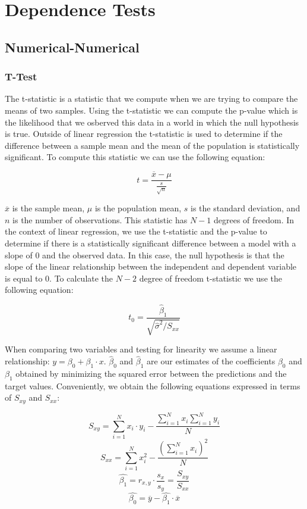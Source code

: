 \documentclass{article}
\begin{document}
\section{Dependence Tests}
\subsection{Numerical-Numerical}
\subsubsection*{T-Test}
The t-statistic is a statistic that we compute when we are trying to compare the means of two samples. Using the t-statistic we can compute the p-value which is the likelihood that we osberved this data in a world in which the null hypothesis is true. Outside of linear regression the t-statistic is used to determine if the difference between a sample mean and the mean of the population is statistically significant. To compute this statistic we can use the following equation:

\[t = \frac{\overline{x} - \mu}{\frac{s}{\sqrt{n}}}\]

\noindent
$\overline{x}$ is the sample mean, $\mu$ is the population mean, $s$ is the standard deviation, and $n$ is the number of observations. This statistic has $N - 1$ degrees of freedom. In the context of linear regression, we use the t-statistic and the p-value to determine if there is a statistically significant difference between a model with a slope of 0 and the observed data. In this case, the null hypothesis is that the slope of the linear relationship between the independent and dependent variable is equal to 0. To calculate the $N-2$ degree of freedom t-statistic we use the following equation:

\[t_0 = \frac{\hat{\beta}_1}{\sqrt{\hat{\sigma}^2/S_{xx}}}\]

\noindent
When comparing two variables and testing for linearity we assume a linear relationship: $y = \beta_0 + \beta_1 \cdot x$. $\hat{\beta}_0$ and $\hat{\beta}_1$ are our estimates of the coefficients $\beta_0$ and $\beta_1$ obtained by minimizing the squared error between the predictions and the target values. Conveniently, we obtain the following equations expressed in terms of $S_{xy}$ and $S_{xx}$:

\[S_{xy} = \sum_{i=1}^{N}x_i \cdot y_i - \frac{\sum_{i=1}^{N}x_i \sum_{i=1}^{N}y_i}{N}\]
\[S_{xx} = \sum_{i=1}^{N}x_i^2 - \frac{(\sum_{i=1}^{N}x_i)^2}{N}\]
\[\hat{\beta_1} = r_{x, y} \cdot \frac{s_x}{s_y} = \frac{S_{xy}}{S_{xx}}\]
\[\hat{\beta_0} = \overline{y} - \hat{\beta_1} \cdot \overline{x}\]
\end{document}
